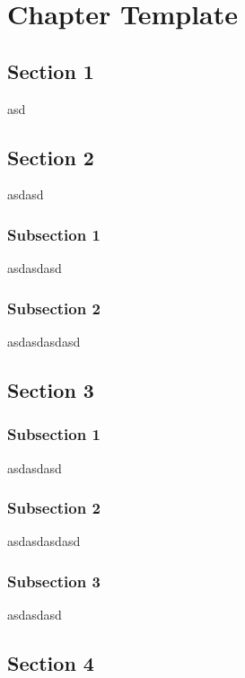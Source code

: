 \label{chapter-template} %
\chapter{Chapter Template}

\section{Section 1}
asd

\section{Section 2}
asdasd

\subsection{Subsection 1}
asdasdasd

\subsection{Subsection 2}
asdasdasdasd

\section{Section 3}

\subsection{Subsection 1}
asdasdasd

\subsection{Subsection 2}
asdasdasdasd

\subsection{Subsection 3}
asdasdasd

\section{Section 4}


